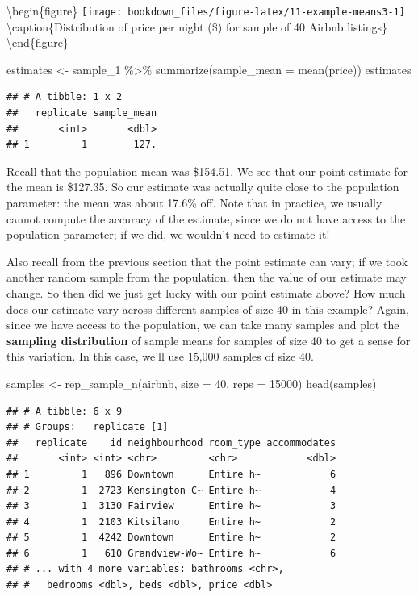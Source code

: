 \documentclass[
]{krantz}
\makeatletter
\newenvironment{Shaded}{\begin{snugshade}}{\end{snugshade}}
\newcommand{\AttributeTok}[1]{\textcolor[rgb]{0.61,0.61,0.61}{#1}}
\newcommand{\DecValTok}[1]{\textcolor[rgb]{0.06,0.06,0.06}{#1}}
\newcommand{\FunctionTok}[1]{\textcolor[rgb]{0,0,0}{#1}}
\newcommand{\NormalTok}[1]{#1}
\newcommand{\OtherTok}[1]{\textcolor[rgb]{0.37,0.37,0.37}{#1}}
\newcommand{\SpecialCharTok}[1]{\textcolor[rgb]{0,0,0}{#1}}
\newenvironment{kframe}{%
\medskip{}
\setlength{\fboxsep}{.8em}
 \def\at@end@of@kframe{}%
 \ifinner\ifhmode%
  \def\at@end@of@kframe{\end{minipage}}%
  \begin{minipage}{\columnwidth}%
 \fi\fi%
 \def\FrameCommand##1{\hskip\@totalleftmargin \hskip-\fboxsep
 \colorbox{shadecolor}{##1}\hskip-\fboxsep
     \hskip-\linewidth \hskip-\@totalleftmargin \hskip\columnwidth}%
 \MakeFramed {\advance\hsize-\width
   \@totalleftmargin\z@ \linewidth\hsize
   \@setminipage}}%
 {\par\unskip\endMakeFramed%
 \at@end@of@kframe}
\renewenvironment{Shaded}{\begin{kframe}}{\end{kframe}}
\makeatother
\begin{document}
\textbackslash begin\{figure\}
\texttt{[image: bookdown\_files/figure-latex/11-example-means3-1]} \textbackslash caption\{Distribution of price per night (\$) for sample of 40 Airbnb listings\}\label{fig:11-example-means3}
\textbackslash end\{figure\}

\begin{Shaded}
\begin{Highlighting}[]
\NormalTok{estimates }\OtherTok{\textless{}{-}}\NormalTok{ sample\_1 }\SpecialCharTok{\%\textgreater{}\%}
  \FunctionTok{summarize}\NormalTok{(}\AttributeTok{sample\_mean =} \FunctionTok{mean}\NormalTok{(price))}
\NormalTok{estimates}
\end{Highlighting}
\end{Shaded}

\begin{verbatim}
## # A tibble: 1 x 2
##   replicate sample_mean
##       <int>       <dbl>
## 1         1        127.
\end{verbatim}

Recall that the population mean
was \$154.51. We see that our point
estimate for the mean is \$127.35. So our estimate was actually quite close to the population parameter: the mean was
about 17.6\% off.
Note that in practice, we usually cannot compute the accuracy of the estimate, since we do not have access to the population
parameter; if we did, we wouldn't need to estimate it!

Also recall from the previous section that the point estimate can vary; if
we took another random sample from the population, then the value of our estimate may change.
So then did we just get lucky with our point estimate above?
How much does our estimate vary across different samples of size 40 in this example? Again, since we have access to the population,
we can take many samples and plot the \textbf{sampling distribution} of sample means for samples of size 40 to get a sense
for this variation. In this case, we'll use 15,000 samples of size 40.

\begin{Shaded}
\begin{Highlighting}[]
\NormalTok{samples }\OtherTok{\textless{}{-}} \FunctionTok{rep\_sample\_n}\NormalTok{(airbnb, }\AttributeTok{size =} \DecValTok{40}\NormalTok{, }\AttributeTok{reps =} \DecValTok{15000}\NormalTok{)}
\FunctionTok{head}\NormalTok{(samples)}
\end{Highlighting}
\end{Shaded}

\begin{verbatim}
## # A tibble: 6 x 9
## # Groups:   replicate [1]
##   replicate    id neighbourhood room_type accommodates
##       <int> <int> <chr>         <chr>            <dbl>
## 1         1   896 Downtown      Entire h~            6
## 2         1  2723 Kensington-C~ Entire h~            4
## 3         1  3130 Fairview      Entire h~            3
## 4         1  2103 Kitsilano     Entire h~            2
## 5         1  4242 Downtown      Entire h~            2
## 6         1   610 Grandview-Wo~ Entire h~            6
## # ... with 4 more variables: bathrooms <chr>,
## #   bedrooms <dbl>, beds <dbl>, price <dbl>
\end{verbatim}
\end{document}
